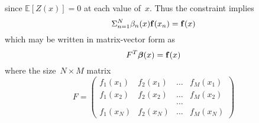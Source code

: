 since $\mathbb{E} [ Z(x) ] = 0$ at each value of~$x$. Thus the constraint  implies
\begin{equation}\label{eq:fseqf}
\Sigma^N_{n=1}\beta_n(x) {\bf f}(x_n) = {\bf f}(x)
\end{equation}
which may be written in matrix-vector form as
\begin{equation}\label{eq:consm}
F^T \mbox{\boldmath ${\beta}$}(x) = {\bf f}(x)
\end{equation} 
where the size~$N \times M$ matrix
\begin{equation}
F = \begin{pmatrix}
f_1(x_1) & f_2(x_1) & \ldots & f_M(x_1) \\
f_1(x_2) & f_2(x_2) & \ldots & f_M(x_2) \\
& & \ldots & \\
f_1(x_N) & f_2(x_N) & \ldots & f_M(x_N) 
\end{pmatrix}
\end{equation}
 

